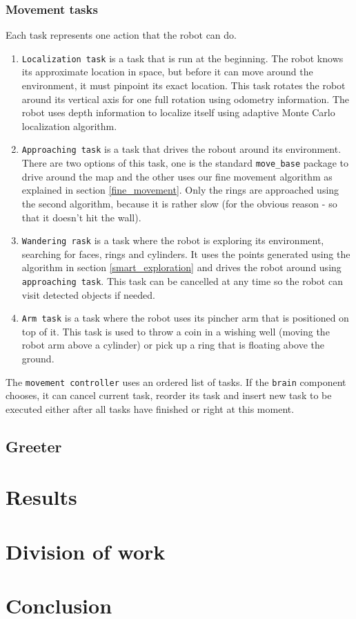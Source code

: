 \documentclass[12pt,a4paper]{article}
\begin{document}
	\subsubsection{Movement tasks}
	Each task represents one action that the robot can do.

	\begin{enumerate}
		\item \texttt{Localization task} is a task that is run at the beginning. The robot knows its approximate location in space, but before it can move around the environment, it must pinpoint its exact location. This task rotates the robot around its vertical axis for one full rotation using odometry information. The robot uses depth information to localize itself using adaptive Monte Carlo localization algorithm.
		\item \texttt{Approaching task} is a task that drives the robout around its environment. There are two options of this task, one is the standard \texttt{move\_base} package to drive around the map and the other uses our fine movement algorithm as explained in section \ref{fine_movement}. Only the rings are approached using the second algorithm, because it is rather slow (for the obvious reason - so that it doesn't hit the wall).
		\item \texttt{Wandering rask} is a task where the robot is exploring its environment, searching for faces, rings and cylinders. It uses the points generated using the algorithm in section \ref{smart_exploration} and drives the robot around using \texttt{approaching task}. This task can be cancelled at any time so the robot can visit detected objects if needed.
		\item \texttt{Arm task} is a task where the robot uses its pincher arm that is positioned on top of it. This task is used to throw a coin in a wishing well (moving the robot arm above a cylinder) or pick up a ring that is floating above the ground.
	\end{enumerate}

	The \texttt{movement controller} uses an ordered list of tasks. If the \texttt{brain} component chooses, it can cancel current task, reorder its task and insert new task to be executed either after all tasks have finished or right at this moment. \\ 
	
	\subsection{Greeter}
	
	\section{Results}
	\section{Division of work}
	
	\section{Conclusion}	
	
\end{document}
